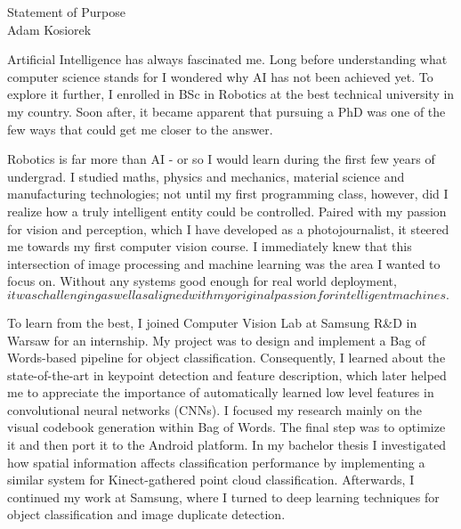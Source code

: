 \documentclass[12pt]{article}
\begin{document}
\begin{center}
{\Large Statement of Purpose} \\[.3in]
{\large Adam Kosiorek}
\end{center}

\vspace*{.5in}


Artificial Intelligence has always fascinated me. Long before understanding what computer science stands for I wondered why AI has not been achieved yet. To explore it further, I enrolled in BSc in Robotics at the best technical university in my country. Soon after, it became apparent that pursuing a PhD was one of the few ways that could get me closer to the answer.

Robotics is far more than AI - or so I would learn during the first few years of undergrad. I studied maths, physics and mechanics, material science and manufacturing technologies; not until my first programming class, however, did I realize how a truly intelligent entity could be controlled. Paired with my passion for vision and perception, which I have developed as a photojournalist, it steered me towards my first computer vision course. I immediately knew that this intersection of image processing and machine learning was the area I wanted to focus on. Without any systems good enough for real world deployment, $it was challenging as well as aligned with my original passion for intelligent machines. $

To learn from the best, I joined Computer Vision Lab at Samsung R\&D in Warsaw for an internship. My project was to design and implement a Bag of Words-based pipeline for object classification. Consequently, I learned about the state-of-the-art in keypoint detection and feature description, which later helped me to appreciate the importance of automatically learned low level features in convolutional neural networks (CNNs). I focused my research mainly on the visual codebook generation within Bag of Words. The final step was to optimize it and then port it to the Android platform. In my bachelor thesis I investigated how spatial information affects classification performance by implementing a similar system for Kinect-gathered point cloud classification. Afterwards, I continued my work at Samsung, where I turned to deep learning techniques for object classification and image duplicate detection.
\end{document}

